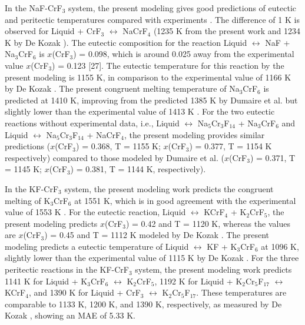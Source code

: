 In the NaF-CrF$_3$ system, the present modeling gives good predictions of eutectic and peritectic temperatures compared with experiments \cite{DeKozak1969}. The difference of 1 K is observed for Liquid + CrF$_3$ $\leftrightarrow$ NaCrF$_4$ (1235 K from the present work and 1234 K by De Kozak \cite{DeKozak1969}). The eutectic composition for the reaction Liquid $\leftrightarrow$ NaF + Na$_3$CrF$_6$ is $x$(CrF$_3$) = 0.098, which is around 0.025 away from the experimental value $x$(CrF$_3$) = 0.123 [27]. The eutectic temperature for this reaction by the present modeling is 1155 K, in comparison to the experimental value of 1166 K by De Kozak \cite{DeKozak1969}. The present congruent melting temperature of Na$_3$CrF$_6$ is predicted at 1410 K, improving from the predicted 1385 K by Dumaire et al. \cite{dumaire2021thermodynamic} but slightly lower than the experimental value of 1413 K \cite{DeKozak1969}. For the two eutectic reactions without experimental data, i.e., Liquid $\leftrightarrow$ Na$_5$Cr$_3$F$_{14}$ + Na$_3$CrF$_6$ and Liquid $\leftrightarrow$ Na$_5$Cr$_3$F$_{14}$ + NaCrF$_4$, the present modeling provides similar predictions ($x$(CrF$_3$) = 0.368, T = 1155 K; $x$(CrF$_3$) = 0.377, T = 1154 K respectively) compared to those modeled by Dumaire et al. \cite{dumaire2021thermodynamic} ($x$(CrF$_3$) = 0.371, T = 1145 K; $x$(CrF$_3$) = 0.381, T = 1144 K, respectively). 

In the KF-CrF$_3$ system, the present modeling work predicts the congruent melting of K$_3$CrF$_6$ at 1551 K, which is in good agreement with the experimental value of 1553 K \cite{DeKozak1969}. For the eutectic reaction, Liquid $\leftrightarrow$ KCrF$_4$ + K$_2$CrF$_5$, the present modeling predicts $x$(CrF$_3$) = 0.42 and T = 1120 K, whereas the values are $x$(CrF$_3$) = 0.45 and T = 1112 K modeled by De Kozak \cite{DeKozak1969}. The present modeling predicts a eutectic temperature of Liquid $\leftrightarrow$ KF + K$_3$CrF$_6$ at 1096 K, slightly lower than the experimental value of 1115 K by De Kozak \cite{DeKozak1969}. For the three peritectic reactions in the KF-CrF$_3$ system, the present modeling work predicts 1141 K for Liquid + K$_3$CrF$_6$ $\leftrightarrow$ K$_2$CrF$_5$, 1192 K for Liquid + K$_2$Cr$_5$F$_{17}$ $\leftrightarrow$ KCrF$_4$, and 1390 K for Liquid + CrF$_3$ $\leftrightarrow$ K$_2$Cr$_5$F$_{17}$. These temperatures are comparable to 1133 K, 1200 K, and 1390 K, respectively, as measured by De Kozak \cite{DeKozak1969}, showing an MAE of 5.33 K.

